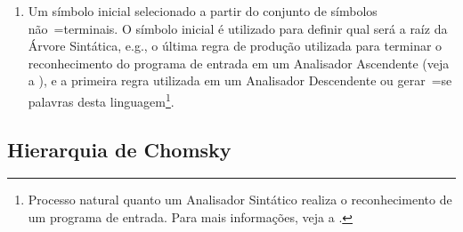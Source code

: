\begin{enumerate}
        \item Um símbolo inicial selecionado a partir do conjunto de símbolos não~=terminais.
        O símbolo inicial é utilizado para definir qual será a raíz da Árvore Sintática,
        e.g.,
        o última regra de produção utilizada para terminar o reconhecimento do programa de entrada em um Analisador Ascendente (veja a ),
        e a primeira regra utilizada em um Analisador Descendente ou
        gerar~=se palavras desta linguagem\footnote{
        Processo natural quanto um Analisador Sintático realiza o reconhecimento de um programa de entrada.
        Para mais informações,
        veja a .
        }.
    \end{enumerate}


\subsection{Hierarquia de Chomsky}
\label{hierarquiaDeChomsky}

